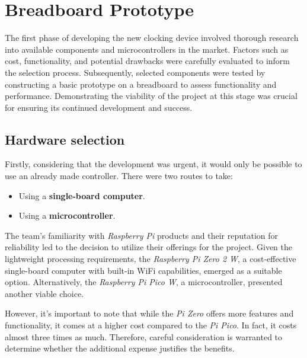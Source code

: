 \chapter{Breadboard Prototype}
\label{cap:breadboardPrototype}

The first phase of developing the new clocking device involved thorough research into available components and 
microcontrollers in the market. Factors such as cost, functionality, and potential drawbacks were carefully 
evaluated to inform the selection process. Subsequently, selected components were tested by constructing a 
basic prototype on a breadboard to assess functionality and performance. Demonstrating the viability of the 
project at this stage was crucial for ensuring its continued development and success.

\section{Hardware selection}

Firstly, considering that the development was urgent, it would only be possible to use an already made 
controller. There were two routes to take:
\begin{itemize}
	\item Using a \textbf{single-board computer}.
	\item Using a \textbf{microcontroller}.
\end{itemize}

The team's familiarity with \textit{Raspberry Pi} products and their reputation for reliability led to the 
decision to utilize their offerings for the project. Given the lightweight processing requirements, the 
\textit{Raspberry Pi Zero 2 W}, a cost-effective single-board computer with built-in WiFi capabilities, emerged 
as a suitable option. Alternatively, the \textit{Raspberry Pi Pico W}, a microcontroller, presented another 
viable choice.

However, it's important to note that while the \textit{Pi Zero} offers more features and functionality, it 
comes at a higher cost compared to the \textit{Pi Pico}. In fact, it costs almost three times as much. 
Therefore, careful consideration is warranted to determine whether the additional expense justifies the benefits.

